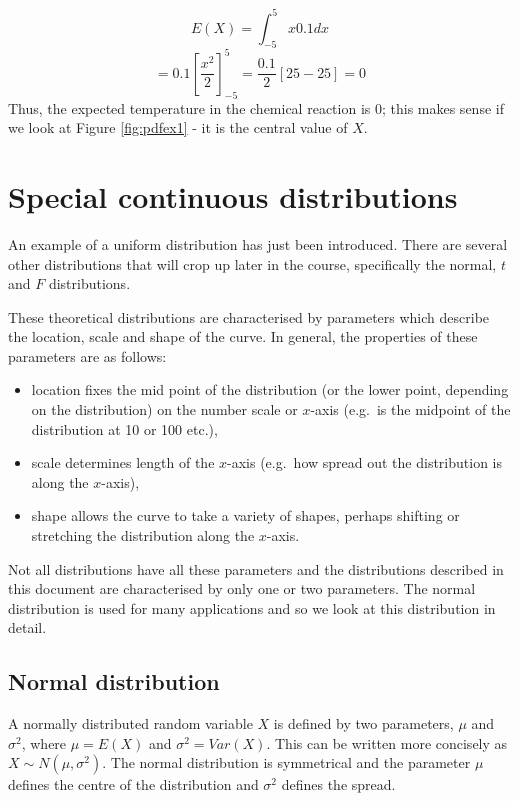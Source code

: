 \documentclass[
  oneside]{krantz}
\begin{document}
\[E(X) = \int_{-5}^{5} x0.1 dx\]
\[ =0.1[\frac{x^2}{2}]_{-5}^{5} = \frac{0.1}{2}[25 - 25] = 0 \]
Thus, the expected temperature in the chemical reaction is 0; this makes sense if we look at Figure \ref{fig:pdfex1} - it is the central value of \(X\).

\hypertarget{special-continuous-distributions}{%
\section{Special continuous distributions}\label{special-continuous-distributions}}

An example of a uniform distribution has just been introduced. There are several other distributions that will crop up later in the course, specifically the normal, \(t\) and \(F\) distributions.

These theoretical distributions are characterised by parameters which describe the location, scale and shape of the curve. In general, the properties of these parameters are as follows:

\begin{itemize}
\item
  location fixes the mid point of the distribution (or the lower point, depending on the distribution) on the number scale or \(x\)-axis (e.g.~is the midpoint of the distribution at 10 or 100 etc.),
\item
  scale determines length of the \(x\)-axis (e.g.~how spread out the distribution is along the \(x\)-axis),
\item
  shape allows the curve to take a variety of shapes, perhaps shifting or stretching the distribution along the \(x\)-axis.
\end{itemize}

Not all distributions have all these parameters and the distributions described in this document are characterised by only one or two parameters. The normal distribution is used for many applications and so we look at this distribution in detail.

\hypertarget{normal-distribution}{%
\subsection{Normal distribution}\label{normal-distribution}}

A normally distributed random variable \(X\) is defined by two parameters, \(\mu\) and \(\sigma^2\), where \(\mu=E(X)\) and \(\sigma^2=Var(X)\). This can be written more concisely as \(X \sim N(\mu, \sigma^2)\). The normal distribution is symmetrical and the parameter \(\mu\) defines the centre of the distribution and \(\sigma^2\) defines the spread.
\end{document}
